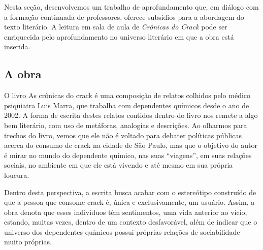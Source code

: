 \documentclass[12pt]{extarticle}
\begin{document}

Nesta seção, desenvolvemos um trabalho de aprofundamento que, em diálogo
com a formação continuada de professores, oferece subsídios para a
abordagem do texto literário. A leitura em sala de aula de
\emph{Crônicas do Crack} pode ser enriquecida pelo aprofundamento no
universo literário em que a obra está inserida.

\subsection{A obra}

O livro As crônicas do crack é uma composição de relatos colhidos
pelo médico psiquiatra Luis Marra, que trabalha com dependentes químicos
desde o ano de 2002. A forma de escrita destes relatos contidos dentro
do livro nos remete a algo bem literário, com uso de metáforas,
analogias e descrições. Ao olharmos para trechos do livro, vemos que ele
não é voltado para debater políticas públicas acerca do consumo de crack
na cidade de São Paulo, mas que o objetivo do autor é mirar no mundo do
dependente químico, nas suas ``viagens'', em suas relações sociais, no
ambiente em que ele está vivendo e até mesmo em sua própria loucura.

Dentro desta perspectiva, a escrita busca acabar com o estereótipo
construído de que a pessoa que consome crack é, única e exclusivamente,
um usuário. Assim, a obra denota que esses indivíduos têm sentimentos,
uma vida anterior ao vício, estando, muitas vezes, dentro de um contexto
desfavorável, além de indicar que o universo dos dependentes químicos
possui próprias relações de sociabilidade muito próprias.
\end{document}

